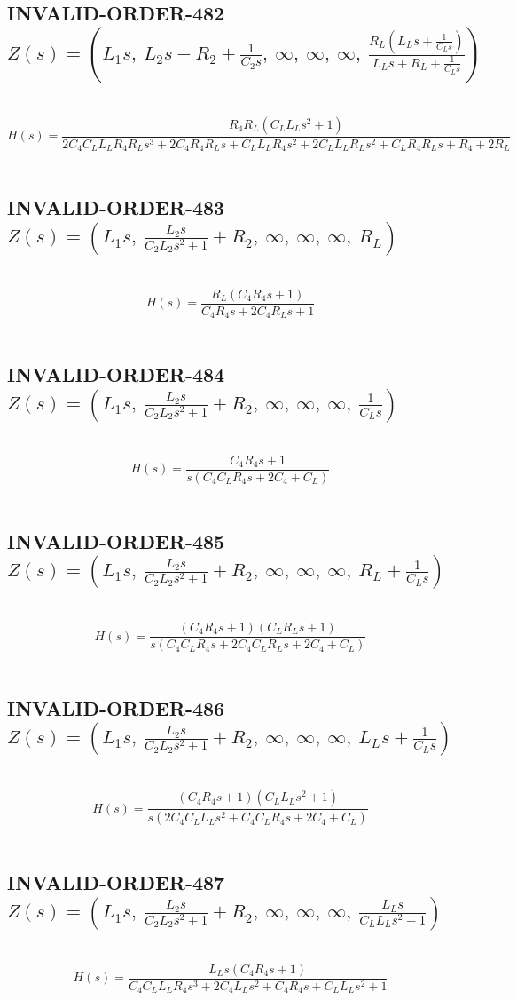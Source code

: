 \documentclass{article}
\begin{document}
\subsection{INVALID-ORDER-482 $Z(s) = \left( L_{1} s, \  L_{2} s + R_{2} + \frac{1}{C_{2} s}, \  \infty, \  \infty, \  \infty, \  \frac{R_{L} \left(L_{L} s + \frac{1}{C_{L} s}\right)}{L_{L} s + R_{L} + \frac{1}{C_{L} s}}\right)$ } \ 
\textbf{\[H(s) = \frac{R_{4} R_{L} \left(C_{L} L_{L} s^{2} + 1\right)}{2 C_{4} C_{L} L_{L} R_{4} R_{L} s^{3} + 2 C_{4} R_{4} R_{L} s + C_{L} L_{L} R_{4} s^{2} + 2 C_{L} L_{L} R_{L} s^{2} + C_{L} R_{4} R_{L} s + R_{4} + 2 R_{L}}\] } \ 
\subsection{INVALID-ORDER-483 $Z(s) = \left( L_{1} s, \  \frac{L_{2} s}{C_{2} L_{2} s^{2} + 1} + R_{2}, \  \infty, \  \infty, \  \infty, \  R_{L}\right)$ } \ 
\textbf{\[H(s) = \frac{R_{L} \left(C_{4} R_{4} s + 1\right)}{C_{4} R_{4} s + 2 C_{4} R_{L} s + 1}\] } \ 
\subsection{INVALID-ORDER-484 $Z(s) = \left( L_{1} s, \  \frac{L_{2} s}{C_{2} L_{2} s^{2} + 1} + R_{2}, \  \infty, \  \infty, \  \infty, \  \frac{1}{C_{L} s}\right)$ } \ 
\textbf{\[H(s) = \frac{C_{4} R_{4} s + 1}{s \left(C_{4} C_{L} R_{4} s + 2 C_{4} + C_{L}\right)}\] } \ 
\subsection{INVALID-ORDER-485 $Z(s) = \left( L_{1} s, \  \frac{L_{2} s}{C_{2} L_{2} s^{2} + 1} + R_{2}, \  \infty, \  \infty, \  \infty, \  R_{L} + \frac{1}{C_{L} s}\right)$ } \ 
\textbf{\[H(s) = \frac{\left(C_{4} R_{4} s + 1\right) \left(C_{L} R_{L} s + 1\right)}{s \left(C_{4} C_{L} R_{4} s + 2 C_{4} C_{L} R_{L} s + 2 C_{4} + C_{L}\right)}\] } \ 
\subsection{INVALID-ORDER-486 $Z(s) = \left( L_{1} s, \  \frac{L_{2} s}{C_{2} L_{2} s^{2} + 1} + R_{2}, \  \infty, \  \infty, \  \infty, \  L_{L} s + \frac{1}{C_{L} s}\right)$ } \ 
\textbf{\[H(s) = \frac{\left(C_{4} R_{4} s + 1\right) \left(C_{L} L_{L} s^{2} + 1\right)}{s \left(2 C_{4} C_{L} L_{L} s^{2} + C_{4} C_{L} R_{4} s + 2 C_{4} + C_{L}\right)}\] } \ 
\subsection{INVALID-ORDER-487 $Z(s) = \left( L_{1} s, \  \frac{L_{2} s}{C_{2} L_{2} s^{2} + 1} + R_{2}, \  \infty, \  \infty, \  \infty, \  \frac{L_{L} s}{C_{L} L_{L} s^{2} + 1}\right)$ } \ 
\textbf{\[H(s) = \frac{L_{L} s \left(C_{4} R_{4} s + 1\right)}{C_{4} C_{L} L_{L} R_{4} s^{3} + 2 C_{4} L_{L} s^{2} + C_{4} R_{4} s + C_{L} L_{L} s^{2} + 1}\] } \ 
\end{document}
